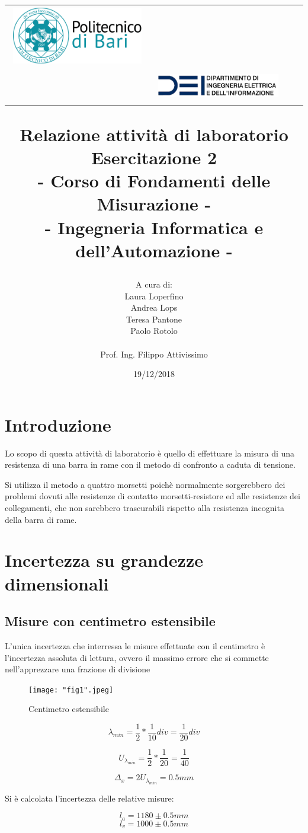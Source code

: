 \documentclass[a4paper]{article}
\title{\begin{center}
		\setlength{\tabcolsep}{0pt}
		\begin{tabular}{>{\raggedleft}m{3cm}>{\centering}m{\textwidth - 5cm\relax}>{\raggedright}m{3cm}}
			\includegraphics[width=\linewidth]{poliba.png}%
			&%
			\textbf{ } \\[5pt]%
			\textbf{\ }%
			&%
			\includegraphics[width=\linewidth]{dei.png} %
		\end{tabular}
	\end{center}
	\textbf{Relazione attività di laboratorio\\}
	\textbf{\large Esercitazione 2\\- Corso di Fondamenti delle Misurazione -\\ }
	{\normalsize 
		- Ingegneria Informatica e dell'Automazione -
}}
\author{A cura di:\\
	Laura Loperfino\\
	Andrea Lops \\
	Teresa Pantone\\
	Paolo Rotolo\\
	\\
	Prof. Ing. Filippo Attivissimo
}
\date{19/12/2018}
\begin{document}
\maketitle

\lstset{language=Matlab}

\section {Introduzione}
Lo scopo di questa attività di laboratorio è quello di effettuare la misura di una resistenza di una barra in rame con il metodo di confronto a caduta di tensione.

Si utilizza il metodo a quattro morsetti poichè normalmente sorgerebbero dei problemi dovuti alle resistenze di contatto
morsetti-resistore ed alle resistenze dei collegamenti, che non sarebbero trascurabili rispetto alla resistenza incognita della barra di rame.

\section {Incertezza su grandezze dimensionali}
\subsection{Misure con centimetro estensibile}
L'unica incertezza che interressa le misure effettuate con il centimetro è l'incertezza assoluta di lettura, ovvero il massimo errore che si commette nell'apprezzare una frazione di divisione

\begin{figure}[htp]
	\centering
	\texttt{[image: "fig1".jpeg]}
	\caption{Centimetro estensibile}
	\label{}
\end{figure}
\begin{Large} 
	\begin{equation}
	\lambda_{min}=\frac{1}{2}*\frac{1}{10} div= \frac{1}{20}div 
	\end{equation}
\end{Large}
\begin{Large} 
	\begin{equation}
	U_{\lambda_{min}}=\frac{1}{2}*\frac{1}{20} = \frac{1}{40} 
	\end{equation}
\end{Large}
\begin{Large} 
	\begin{equation}
	\Delta_x=2U_{\lambda_{min}} = 0.5 mm 
	\end{equation}
\end{Large}
Si è calcolata l'incertezza delle relative misure: 
\begin{Large} 
	\begin{equation}
		l_a = 1180\pm0.5mm
	 \end{equation}
	 \begin{equation}
		l_v = 1000\pm0.5mm
	 \end{equation}
\end{Large}
\end{document}
